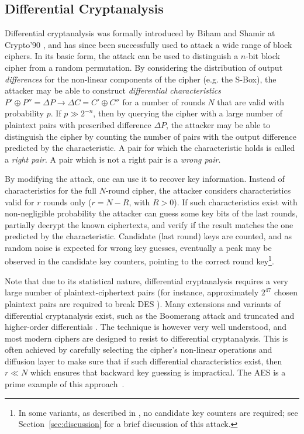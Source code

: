 \subsection{Differential Cryptanalysis}
Differential cryptanalysis was formally introduced by Biham and Shamir at Crypto'90 \cite{Biham1991}, and has since been successfully used to attack a
wide range of block ciphers. In its basic form, the attack can be used to distinguish a $n$-bit block cipher from a random permutation. By considering the distribution of output \emph{differences} for the non-linear components of the cipher (e.g. the S-Box), the attacker may be able to construct \emph{differential characteristics} \mbox{$P' \oplus P'' = \Delta P \rightarrow \Delta C = C' \oplus C''$} for a number of rounds $N$ that are valid with probability $p$. If $p \gg 2^{-n}$, then by querying the cipher with a large number of plaintext pairs with prescribed difference $\Delta P$, the attacker may be able to distinguish the cipher by counting the number of pairs with the output difference predicted by the characteristic. A pair for which the characteristic holds is called a \emph{right pair}. A pair which is not a right pair is a \emph{wrong pair}.

By modifying the attack, one can use it to recover key information. Instead of characteristics for the full $N$-round cipher, the attacker considers characteristics valid for $r$ rounds only ($r = N - R $, with $R>0$). If such characteristics exist with non-negligible probability the attacker can guess some key bits of the last rounds, partially decrypt the known ciphertexts, and verify if the result matches the one predicted by the characteristic. Candidate (last round) keys are counted, and as random noise is expected for wrong key guesses, eventually a peak may be observed in the candidate key counters, pointing to the correct round key\footnote{In some variants, as described in \cite{fulldes-dc}, no candidate key counters are required; see Section~\ref{sec:discussion} for a brief discussion of this attack.}.

Note that due to its statistical nature, differential cryptanalysis requires a very large number of plaintext-ciphertext pairs (for instance, approximately $2^{47}$ chosen plaintext pairs are required to break DES \cite{fulldes-dc}). Many extensions and variants of differential cryptanalysis exist, such as the Boo\-merang attack \cite{Wagner1999} and truncated and higher-order differentials \cite{Knudsen1995}. The technique is however very well understood, and most modern ciphers are designed to resist to differential cryptanalysis. This is often achieved by carefully selecting the cipher's non-linear operations and diffusion layer to make sure that if such differential characteristics exist, then $r \ll N$ which ensures that backward key guessing is impractical. The AES is a prime example of this approach~\cite{Daemen2002}.

